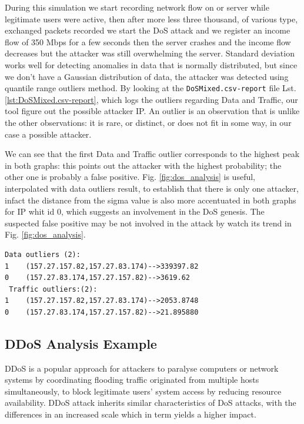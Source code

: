 During this simulation we start recording network flow on or server while legitimate users were active, then after more less three thousand, of various type, exchanged packets recorded we start the DoS attack and we register an income flow of 350 Mbps for a few seconds then the server crashes and the income flow decreases but the attacker was still overwhelming the server.
Standard deviation works well for detecting anomalies in data that is normally distributed, but since we don't have a Gaussian distribution of data, the attacker was detected using quantile range outliers method. 
By looking at the \texttt{DoSMixed.csv-report} file Lst. \ref{lst:DoSMixed.csv-report}, which logs the outliers regarding Data and Traffic, our tool figure out the possible attacker IP. An outlier is an observation that is unlike the other observations: it is rare, or distinct, or does not fit in some way\cite{outliers}, in our case a possible attacker.

We can see that the first Data and Traffic outlier corresponds to the highest peak in both graphs: this points out the attacker with the highest probability; the other one is probably a false positive.
Fig. \ref{fig:dos_analysis} is useful, interpolated with data outliers result, to establish that there is only one attacker, infact the distance from the sigma value is also more accentuated in both graphs for IP whit id 0, which suggests an involvement in the DoS genesis. The suspected false positive may be not involved in the attack by watch its trend in Fig. \ref{fig:dos_analysis}.

\begin{lstlisting}[columns=flexible, breaklines=true, frame=tb, caption={\textit{DoSMixed.csv-report} file}, label={lst:DoSMixed.csv-report}]
 Data outliers (2):
1    (157.27.157.82,157.27.83.174)-->339397.82
0    (157.27.83.174,157.27.157.82)-->3619.62
 Traffic outliers:(2):
1    (157.27.157.82,157.27.83.174)-->2053.8748
0    (157.27.83.174,157.27.157.82)-->21.895880
\end{lstlisting}

\subsection{DDoS Analysis Example}
DDoS is a popular approach for attackers to paralyse computers or network systems by coordinating flooding traffic originated from multiple hosts simultaneously, to block legitimate users' system access by reducing resource availability. 
DDoS attack inherits similar characteristics of DoS attacks, with the differences in an increased scale which in term yields a higher impact\cite{ddos_forensics}.


